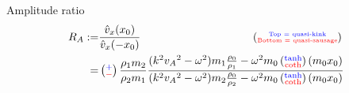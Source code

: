 \documentclass{beamer}
\begin{document}
\begin{frame}
\begin{figure}
\end{figure}
\vspace{-0.3cm}
\begin{block}{Amplitude ratio}
\vspace{-0.3cm}
\begin{align*}
R_A :=& \frac{\hat{v}_x(x_0)}{\hat{v}_x(-x_0)} \qquad \qquad \qquad \qquad \qquad \left(\substack{\text{\textcolor{blue}{\tiny Top = quasi-kink}} \\ \text{\tiny \textcolor{red}{Bottom = quasi-sausage}}}\right)\\
=&\left(\substack{\textcolor{blue}{+} \\ \textcolor{red}{-}}\right) \frac{\rho_1m_2}{\rho_2m_1}\frac{(k^2{v_A}^2-\omega^2)m_1\frac{\rho_0}{\rho_1}-\omega^2{m_0}\left(\substack{\textcolor{blue}{\tanh} \\ \textcolor{red}{\coth}}\right){({m_0}x_0)}}{(k^2{v_A}^2-\omega^2)m_2\frac{\rho_0}{\rho_2}-\omega^2{m_0}\left(\substack{\textcolor{blue}{\tanh} \\ \textcolor{red}{\coth}}\right){({m_0}x_0)}}
\end{align*}
\end{block}
\end{frame}
\end{document}
